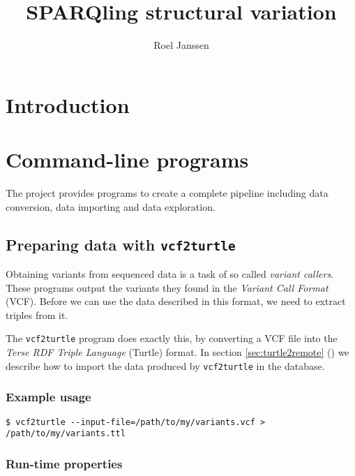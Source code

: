 \documentclass[11pt,a4paper]{book}
\title{SPARQling structural variation}
\author{Roel Janssen}
\begin{document}
\begin{titlepage}
  \maketitle
  \thispagestyle{empty}
\end{titlepage}


\setcounter{page}{1}
\tableofcontents
\newpage{}

\setcounter{page}{1}

\chapter{Introduction}

\chapter{Command-line programs}

  The project provides programs to create a complete pipeline including
  data conversion, data importing and data exploration.
  
\section{Preparing data with \texttt{vcf2turtle}}

  Obtaining variants from sequenced data is a task of so called
  \emph{variant callers}.  These programs output the variants they found in
  the \emph{Variant Call Format} (VCF).  Before we can use the data described
  in this format, we need to extract triples from it.

  The \texttt{vcf2turtle} program does exactly this, by converting a VCF file
  into the \emph{Terse RDF Triple Language} (Turtle) format.  In section
  \ref{sec:turtle2remote} () we describe how to
  import the data produced by \texttt{vcf2turtle} in the database.

\subsection{Example usage}

\begin{verbatim}
$ vcf2turtle --input-file=/path/to/my/variants.vcf > /path/to/my/variants.ttl
\end{verbatim}

\subsection{Run-time properties}
\end{document}
